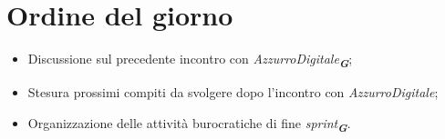 

\section{Ordine del giorno}

\begin{itemize}
    \item Discussione sul precedente incontro con \emph{AzzurroDigitale}\textsubscript{\textbf{\textit{G}}};
    \item Stesura prossimi compiti da svolgere dopo l'incontro con \emph{AzzurroDigitale};
    \item Organizzazione delle attività burocratiche di fine \emph{sprint}\textsubscript{\textbf{\textit{G}}}.
\end{itemize}